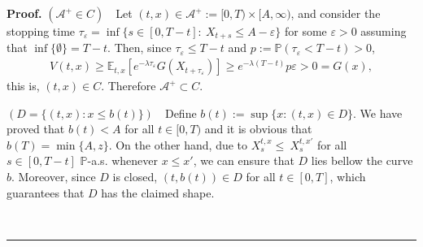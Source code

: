 \documentclass{tufte-handout}
\renewcommand{\Pr}{\mathbb{P}} %
\newenvironment{pf}[1][Proof]{\textbf{#1.} }{\ \rule{0.5em}{0.5em}}
\begin{document}
	\begin{pf}
		$(\mathcal{A}^+ \in C)$\ \ Let $(t, x)\in \mathcal{A}^+ := [0, T)\times[A, \infty)$, and consider the stopping time $\tau_\varepsilon = \inf\{s\in[0, T - t] :\ X_{t + s} \leq A - \varepsilon\}$ for some $\varepsilon > 0$ assuming that $\inf\{\emptyset\} = T - t$. Then, since $\tau_{\varepsilon} \leq T - t$ and $p := \mathbb{P}(\tau_\varepsilon < T - t) > 0$,
		\begin{align*}
		V(t, x) \geq \mathbb{E}_{t, x}\left[e^{-\lambda\tau_{\varepsilon}}G(X_{t + \tau_{\varepsilon}})\right] \geq e^{-\lambda(T - t)}p\varepsilon > 0 = G(x),
		\end{align*}
		this is, $(t, x)\in C$. Therefore $\mathcal{A}^+ \subset C$.	\\ \vspace{0.3cm}
		
		$(D = \{(t, x) : x \leq b(t)\})$\ \ Define $b(t) := \sup\{x : (t, x) \in D\}$. We have proved that $b(t) < A$ for all $t\in[0, T)$ and it is obvious that $b(T) = \min\{A, z\}$. On the other hand, due to $X_s^{t, x} \leq\ X_s^{t, x'}$ for all $s\in [0, T - t]$ $\Pr$-a.s. whenever $x \leq x'$, we can ensure that $D$ lies bellow the curve $b$. Moreover, since $D$ is closed, $(t, b(t)) \in D$ for all $t\in[0, T]$, which guarantees that $D$ has the claimed shape. \\  \vspace{0.3cm}
		

\end{pf}
\end{document}
